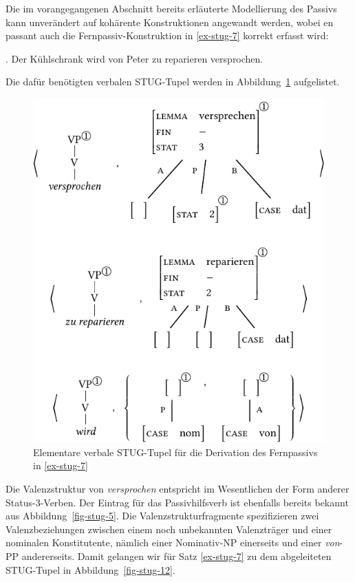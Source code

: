 Die im vorangegangenen Abschnitt bereits erläuterte Modellierung des Passivs kann unverändert auf kohärente Konstruktionen angewandt werden, wobei en passant auch die Fernpassiv-Konstruktion in \ref{ex-stug-7} korrekt erfasst wird:

\ex. \label{ex-stug-7} Der Kühlschrank wird von Peter zu reparieren versprochen.

Die dafür benötigten verbalen STUG-Tupel werden in Abbildung~\ref{fig-stug-11} aufgelistet.
\begin{figure}[t]
\centering
\includegraphics{graphics/abb99.pdf}
\caption{\label{fig-stug-11}Elementare verbale STUG-Tupel für die Derivation des Fernpassivs in \ref{ex-stug-7}}
\end{figure} 
Die Valenzstruktur von {\it versprochen} entspricht im Wesentlichen der Form anderer Status-3-Verben. Der Eintrag für das Passivhilfsverb ist ebenfalls bereits bekannt aus Abbildung~\ref{fig-stug-5}. Die Valenzstrukturfragmente spezifizieren zwei Valenzbeziehungen zwischen einem noch unbekannten Valenzträger und einer nominalen Konstitutente, nämlich einer Nominativ-NP einerseits und einer \emph{von}-PP andererseits. Damit gelangen wir für Satz \ref{ex-stug-7} zu dem abgeleiteten STUG-Tupel in Abbildung~\ref{fig-stug-12}.
